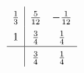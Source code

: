 \begin{gather*}
  \def\arraystretch{1.5}
  \begin{array}{c|cc}  
    \frac13 & \frac{5}{12} & -\frac{1}{12}
    \\
    1 & \frac34 & \frac14
    \\\hline
            & \frac34 & \frac14
  \end{array}
\end{gather*}

